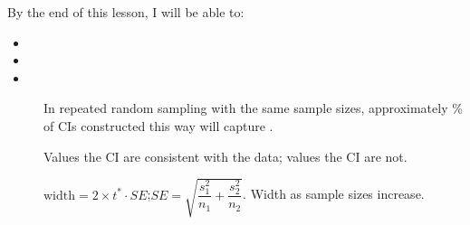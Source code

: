 \documentclass[10pt]{article}
\begin{document}
\namedateperiod

\vspace{0.15in}

\begin{objectivebox}
By the end of this lesson, I will be able to:
\begin{itemize}
  \item {}
  \item {}
  \item {}
\end{itemize}
\end{objectivebox}

\begin{vocabbox}
\begin{description}
  \item[]
        In repeated random sampling with the same sample sizes, approximately \%
        of CIs constructed this way will capture .
  \item[]
        Values  the CI are consistent with the data; values  the
        CI are not.
  \item[]
        $\text{width} = 2 \times t^* \cdot SE$;\quad $SE = \sqrt{\dfrac{s_1^2}{n_1} + \dfrac{s_2^2}{n_2}}$.
        Width  as sample sizes increase.
\end{description}
\end{vocabbox}
\end{document}

